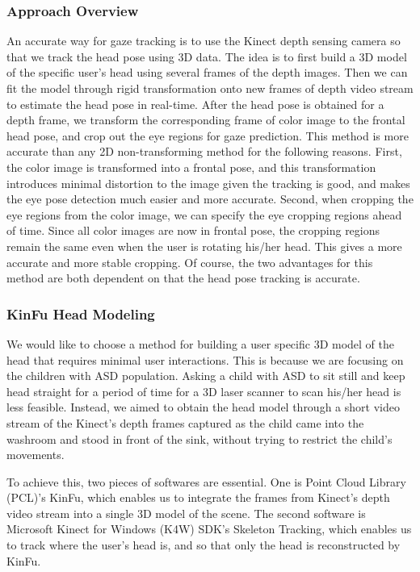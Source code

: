 \documentclass{ut-thesis}
\begin{document}
\subsubsection{Approach Overview}
\label{sec:approachOverview}
An accurate way for gaze tracking is to use the Kinect depth sensing camera so that we track the head pose using 3D data.  The idea is to first build a 3D model of the specific user's head using several frames of the depth images.  Then we can fit the model through rigid transformation onto new frames of depth video stream to estimate the head pose in real-time.  After the head pose is obtained for a depth frame, we transform the corresponding frame of color image to the frontal head pose, and crop out the eye regions for gaze prediction.  This method is more accurate than any 2D non-transforming method for the following reasons.  First, the color image is transformed into a frontal pose, and this transformation introduces minimal distortion to the image given the tracking is good, and makes the eye pose detection much easier and more accurate.  Second, when cropping the eye regions from the color image, we can specify the eye cropping regions ahead of time.  Since all color images are now in frontal pose, the cropping regions remain the same even when the user is rotating his/her head.  This gives a more accurate and more stable cropping.  Of course, the two advantages for this method are both dependent on that the head pose tracking is accurate.

\subsubsection{KinFu Head Modeling}
We would like to choose a method for building a user specific 3D model of the head that requires minimal user interactions.  This is because we are focusing on the children with ASD population.  Asking a child with ASD to sit still and keep head straight for a period of time for a 3D laser scanner to scan his/her head is less feasible.  Instead, we aimed to obtain the head model through a short video stream of the Kinect's depth frames captured as the child came into the washroom and stood in front of the sink, without trying to restrict the child's movements.

To achieve this, two pieces of softwares are essential.  One is Point Cloud Library (PCL)'s KinFu, which enables us to integrate the frames from Kinect's depth video stream into a single 3D model of the scene.  The second software is Microsoft Kinect for Windows (K4W) SDK's Skeleton Tracking, which enables us to track where the user's head is, and so that only the head is reconstructed by KinFu.
\end{document}
